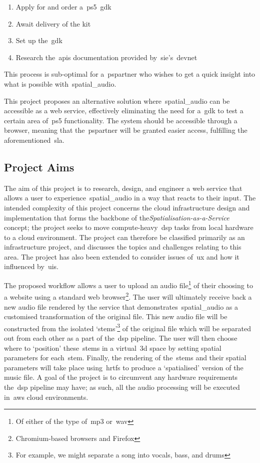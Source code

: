 \begin{enumerate}
    \item Apply for and order a~\gls{ps5}~\gls{gdk}
    \item Await delivery of the kit
    \item Set up the~\gls{gdk}
    \item Research the~\glspl{api} documentation provided by~\gls{sie}'s~\gls{devnet}
\end{enumerate}

This process is sub-optimal for a~\gls{pspartner} who wishes to get a quick insight into what is possible with~\gls{spatial_audio}.

This project proposes an alternative solution where~\gls{spatial_audio} can be accessible as a web service,
effectively eliminating the need for a~\gls{gdk} to test a certain area of~\gls{ps5} functionality.
The system should be accessible through a browser, meaning that the~\gls{pspartner} will be granted easier access, fulfilling the aforementioned~\gls{sla}.

\subsection{Project Aims}\label{subsec:aims}

The aim of this project is to research, design, and engineer a web service that allows a user to experience~\gls{spatial_audio} in a way that reacts to their input.
The intended complexity of this project concerns the cloud infrastructure design and implementation that forms the backbone of the\textit{Spatialisation-as-a-Service} concept;
the project seeks to move compute-heavy~\gls{dsp} tasks from local hardware to a cloud environment.
The project can therefore be classified primarily as an infrastructure project, and discusses the topics and challenges relating to this area.
The project has also been extended to consider issues of~\gls{ux} and how it influenced by~\glspl{ui}.

The proposed workflow allows a user
to upload an audio file\footnote{Of either of the type of~\gls{mp3} or~\gls{wav}} of their choosing to a website using a standard web browser\footnote{Chromium-based browsers and Firefox}.
The user will ultimately receive back a new audio file rendered by the service that demonstrates~\gls{spatial_audio} as a customised transformation of the original file.
This new audio file will be constructed from the isolated `\glspl{stem}'\footnote{For example, we might separate a song into vocals, bass, and drums} of the original file which will be separated out from each other as a part of the~\gls{dsp} pipeline.
The user will then choose where to `position' these~\glspl{stem} in a virtual~\gls{3d} space by setting spatial parameters for each~\gls{stem}.
Finally, the rendering of the~\glspl{stem} and their spatial parameters will take place using~\glspl{hrtf} to produce a `spatialised' version of the music file.
A goal of the project is to circumvent any hardware requirements the~\gls{dsp} pipeline may have;
as such, all the audio processing will be executed in~\gls{aws} cloud environments.

